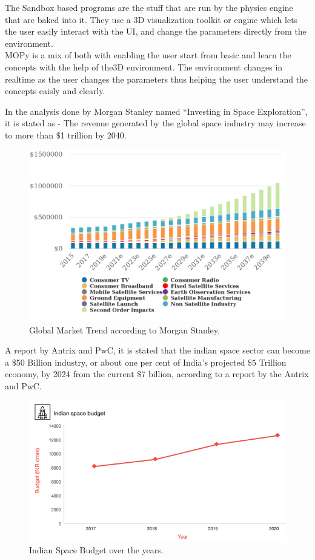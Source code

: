 \hspace{4em}The Sandbox based programs are the stuff that are run by the physics engine that are baked into it. They use a 3D visualization toolkit or engine which lets the user easily interact with the UI, and change the parameters directly from the environment.\\
MOPy is a mix of both with enabling the user start from basic and learn the concepts with the help of the3D environment. The environment changes in realtime as the user changes the parameters thus helping the user understand the concepts eaisly and clearly.

In the analysis done by Morgan Stanley named \enquote{Investing in Space Exploration}, it is stated as - The revenue generated by the global space industry may increase to more than $\$$1 trillion by 2040. 
\begin{figure}[H]
\centering
\includegraphics[scale=0.29]{images/morganstanley.png}
\caption{Global Market Trend according to Morgan Stanley.} \label{morgangraph}
\end{figure}
A report by Antrix and PwC, it is stated that the indian space sector can become a $\$$50 Billion industry, or about one per cent of India's projected $\$5$ Trillion economy, by 2024 from the current $\$7$ billion, according to a report by the Antrix and PwC.
\begin{figure}[H]
\centering
\includegraphics[scale=1]{images/pwc.png}
\caption{Indian Space Budget over the years.} \label{pwc}
\end{figure}
